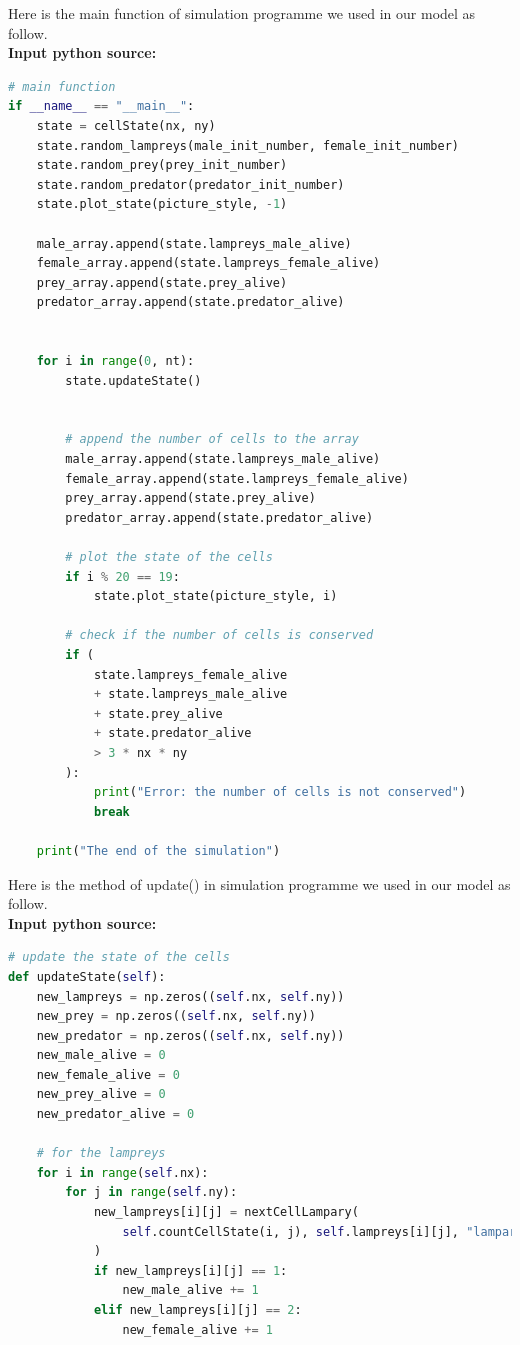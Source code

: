 \documentclass{mcmthesis}
\begin{document}
\newpage
\begin{appendices}
Here is the main function of simulation programme we used in our model as follow.\\
\textbf{\textcolor[rgb]{0.98,0.00,0.00}{Input python source:}}
\begin{lstlisting}[language=python]
# main function
if __name__ == "__main__":
    state = cellState(nx, ny)
    state.random_lampreys(male_init_number, female_init_number)
    state.random_prey(prey_init_number)
    state.random_predator(predator_init_number)
    state.plot_state(picture_style, -1)

    male_array.append(state.lampreys_male_alive)
    female_array.append(state.lampreys_female_alive)
    prey_array.append(state.prey_alive)
    predator_array.append(state.predator_alive)


    for i in range(0, nt):
        state.updateState()

   
        # append the number of cells to the array
        male_array.append(state.lampreys_male_alive)
        female_array.append(state.lampreys_female_alive)
        prey_array.append(state.prey_alive)
        predator_array.append(state.predator_alive)

        # plot the state of the cells
        if i % 20 == 19:
            state.plot_state(picture_style, i)

        # check if the number of cells is conserved
        if (
            state.lampreys_female_alive
            + state.lampreys_male_alive
            + state.prey_alive
            + state.predator_alive
            > 3 * nx * ny
        ):
            print("Error: the number of cells is not conserved")
            break

    print("The end of the simulation")
\end{lstlisting}

Here is the method of update() in simulation programme we used in our model as follow.\\
\textbf{\textcolor[rgb]{0.98,0.00,0.00}{Input python source:}}
\begin{lstlisting}[language=python]
# update the state of the cells
def updateState(self):
    new_lampreys = np.zeros((self.nx, self.ny))
    new_prey = np.zeros((self.nx, self.ny))
    new_predator = np.zeros((self.nx, self.ny))
    new_male_alive = 0
    new_female_alive = 0
    new_prey_alive = 0
    new_predator_alive = 0

    # for the lampreys
    for i in range(self.nx):
        for j in range(self.ny):
            new_lampreys[i][j] = nextCellLampary(
                self.countCellState(i, j), self.lampreys[i][j], "lampary"
            )
            if new_lampreys[i][j] == 1:
                new_male_alive += 1
            elif new_lampreys[i][j] == 2:
                new_female_alive += 1


\end{lstlisting}
\end{appendices}
\end{document}
